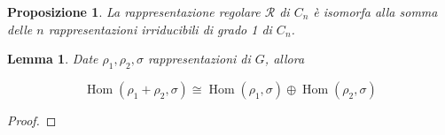 \documentclass[11pt]{article}
\theoremstyle{plain}
\newtheorem{lemma}[thm]{Lemma}
\newtheorem{prop}[thm]{Proposizione}
\theoremstyle{definition}
\theoremstyle{remark}
\DeclareMathOperator{\Hom}{Hom}
\begin{document}
\begin{prop} La rappresentazione regolare $\mathcal{R}$ di $C_n$ è isomorfa alla somma delle $n$ rappresentazioni irriducibili di grado 1 di $C_n$.

\end{prop}


\begin{lemma}
Date $\rho_1, \rho_2, \sigma$ rappresentazioni di $G$, allora

\[\Hom(\rho_1 + \rho_2, \sigma) \cong \Hom(\rho_1, \sigma) \oplus \Hom(\rho_2, \sigma)\]

\end{lemma}

\begin{proof}



\end{proof}
\end{document}
